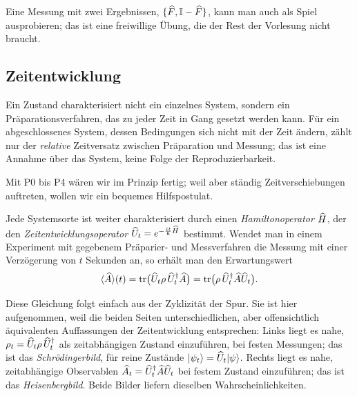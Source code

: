 \begin{webonly}
Eine Messung mit zwei Ergebnissen, $\{\widehat{F}, \mathbb{I}-\widehat{F}\}$, kann man auch als Spiel ausprobieren; das ist eine freiwillige Übung, die der Rest der Vorlesung nicht braucht.
\end{webonly}


\subsection{Zeitentwicklung}
Ein Zustand charakterisiert nicht ein einzelnes System, sondern ein Präparationsverfahren, das zu jeder Zeit in Gang gesetzt werden kann. Für ein abgeschlossenes System, dessen Bedingungen sich nicht mit der Zeit ändern, zählt nur der \emph{relative} Zeitversatz zwischen Präparation und Messung; das ist eine Annahme über das System, keine Folge der Reproduzierbarkeit.

Mit P0 bis P4 wären wir im Prinzip fertig; weil aber ständig Zeitverschiebungen auftreten, wollen wir ein bequemes Hilfspostulat.

\begin{merksatz}[P5]
	Jede Systemsorte ist weiter charakterisiert durch einen \emph{Hamiltonoperator} $\widehat{H}$, der den \emph{Zeitentwicklungsoperator} $\widehat{U}_t = e^{-\frac{it}{\hbar}\widehat{H}}$ bestimmt. Wendet man in einem Experiment mit gegebenem Präparier- und Messverfahren die Messung mit einer Verzögerung von $t$ Sekunden an, so erhält man den Erwartungswert
	\begin{equation}
		\langle\widehat{A}\rangle(t) = \operatorname{tr}\bigl(\widehat{U}_t\rho\,\widehat{U}_t^{\dagger}\widehat{A}\bigr) = \operatorname{tr}\bigl(\rho\,\widehat{U}_t^{\dagger}\widehat{A}\widehat{U}_t\bigr).
	\end{equation}
\end{merksatz}
Diese Gleichung folgt einfach aus der Zyklizität der Spur. Sie ist hier aufgenommen, weil die beiden Seiten unterschiedlichen, aber offensichtlich äquivalenten Auffassungen der Zeitentwicklung entsprechen: Links liegt es nahe, $\rho_t = \widehat{U}_t\rho\,\widehat{U}_t^{\dagger}$ als zeitabhängigen Zustand einzuführen, bei festen Messungen; das ist das \emph{Schrödingerbild}, für reine Zustände $\lvert \psi_t \rangle = \widehat{U}_t\lvert \psi \rangle$. Rechts liegt es nahe, zeitabhängige Observablen $\widehat{A}_t = \widehat{U}_t^{\dagger}\widehat{A}\widehat{U}_t$ bei festem Zustand einzuführen; das ist das \emph{Heisenbergbild}. Beide Bilder liefern dieselben Wahrscheinlichkeiten.

